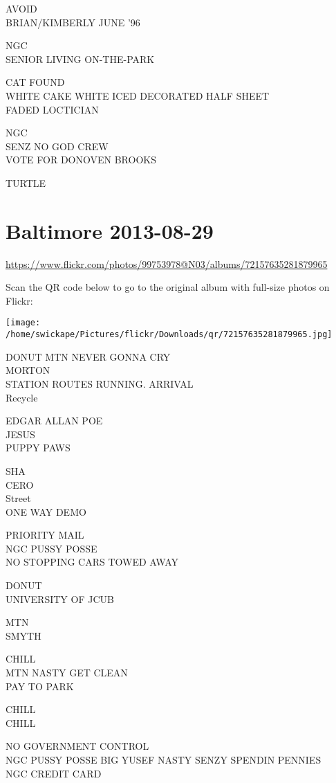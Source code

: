 \documentclass[10pt,letterpaper]{article}
\begin{document}
AVOID\\
BRIAN/KIMBERLY JUNE '96

NGC\\
SENIOR LIVING ON{-}THE{-}PARK

CAT FOUND\\
WHITE CAKE WHITE ICED DECORATED HALF SHEET\\
FADED LOCTICIAN

NGC\\
SENZ NO GOD CREW\\
VOTE FOR DONOVEN BROOKS

TURTLE


\section*{Baltimore 2013-08-29}

\url{https://www.flickr.com/photos/99753978@N03/albums/72157635281879965}

Scan the QR code below to go to the original album with full-size photos on Flickr:

\texttt{[image: /home/swickape/Pictures/flickr/Downloads/qr/72157635281879965.jpg]}


DONUT MTN NEVER GONNA CRY\\
MORTON\\
STATION ROUTES RUNNING. ARRIVAL\\
Recycle

EDGAR ALLAN POE\\
JESUS\\
PUPPY PAWS

SHA\\
CERO\\
Street\\
ONE WAY DEMO

PRIORITY MAIL\\
NGC PUSSY POSSE\\
NO STOPPING CARS TOWED AWAY

DONUT\\
UNIVERSITY OF JCUB

MTN\\
SMYTH

CHILL\\
MTN NASTY GET CLEAN\\
PAY TO PARK

CHILL\\
CHILL

NO GOVERNMENT CONTROL\\
NGC PUSSY POSSE BIG YUSEF NASTY SENZY SPENDIN PENNIES\\
NGC CREDIT CARD
\end{document}
